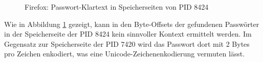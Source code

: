 \begin{figure}[h!]
	\centering
	\hfill
	\caption{Firefox: Passwort-Klartext in Speicherseiten von PID 8424}
	\label{img:firefox-pw-offset-pid-8424}  
\end{figure}
Wie in Abbildung \ref{img:firefox-pw-offset-pid-8424} gezeigt, kann in den Byte-Offsets der gefundenen Passwörter in der Speicherseite der PID 8424 kein sinnvoller Kontext ermittelt werden. Im Gegensatz zur Speicherseite der PID 7420 wird das Passwort dort mit 2 Bytes pro Zeichen enkodiert, was eine Unicode-Zeichenenkodierung vermuten lässt.


